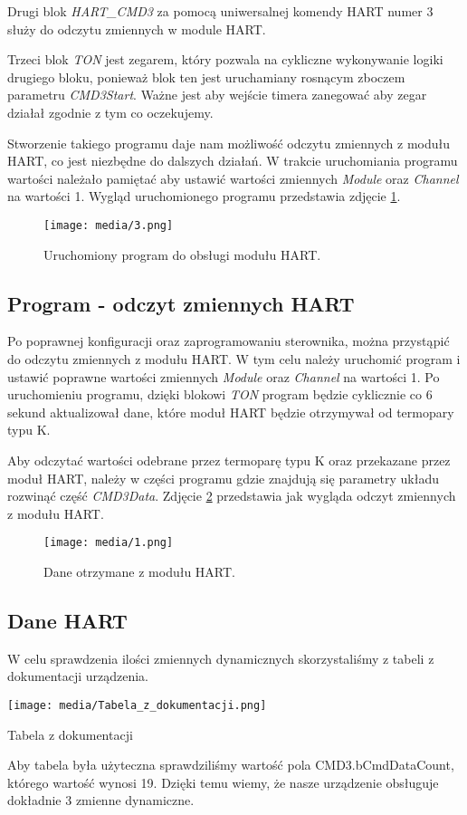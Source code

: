 \documentclass{article}
\begin{document}
Drugi blok \textit{HART\_CMD3} za pomocą uniwersalnej komendy HART numer 3 służy do odczytu zmiennych w module HART.

Trzeci blok \textit{TON} jest zegarem, który pozwala na cykliczne wykonywanie logiki drugiego bloku, ponieważ blok ten jest uruchamiany rosnącym zboczem parametru \textit{CMD3Start}. Ważne jest aby wejście timera zanegować aby zegar działał zgodnie z tym co oczekujemy.
\newpage

Stworzenie takiego programu daje nam możliwość odczytu zmiennych z modułu HART, co jest niezbędne do dalszych działań. W trakcie uruchomiania programu wartości należało pamiętać aby ustawić wartości zmiennych \textit{Module} oraz \textit{Channel} na wartości 1. Wygląd uruchomionego programu przedstawia zdjęcie \ref{fig3}.

\vspace{1em}
\begin{figure}[ht]
    \centering
    \texttt{[image: media/3.png]}
    \caption{Uruchomiony program do obsługi modułu HART.}
    \label{fig3}
\end{figure}

\newpage
\subsection{Program - odczyt zmiennych HART}
Po poprawnej konfiguracji oraz zaprogramowaniu sterownika, można przystąpić do odczytu zmiennych z modułu HART. W tym celu należy uruchomić program i ustawić poprawne wartości zmiennych \textit{Module} oraz \textit{Channel} na wartości 1. Po uruchomieniu programu, dzięki blokowi \textit{TON} program będzie cyklicznie co 6 sekund aktualizował dane, które moduł HART będzie otrzymywał od termopary typu K.

Aby odczytać wartości odebrane przez termoparę typu K oraz przekazane przez moduł HART, należy w części programu gdzie znajdują się parametry układu rozwinąć część \textit{CMD3Data}. Zdjęcie \ref{fig4} przedstawia jak wygląda odczyt zmiennych z modułu HART.


\vspace{1em}
\begin{figure}[ht]
    \centering
    \texttt{[image: media/1.png]}
    \caption{Dane otrzymane z modułu HART.}
    \label{fig4}
\end{figure}

\newpage
\subsection{Dane HART}
W celu sprawdzenia ilości zmiennych dynamicznych skorzystaliśmy z  tabeli z dokumentacji urządzenia. 
\begin{table}[H]
    \centering
    \texttt{[image: media/Tabela\_z\_dokumentacji.png]}
    \caption{Tabela z dokumentacji}
\end{table}
Aby tabela była użyteczna sprawdziliśmy wartość pola CMD3.bCmdDataCount, którego wartość wynosi 19. Dzięki temu wiemy, że nasze urządzenie obsługuje dokładnie 3 zmienne dynamiczne. 
\end{document}
